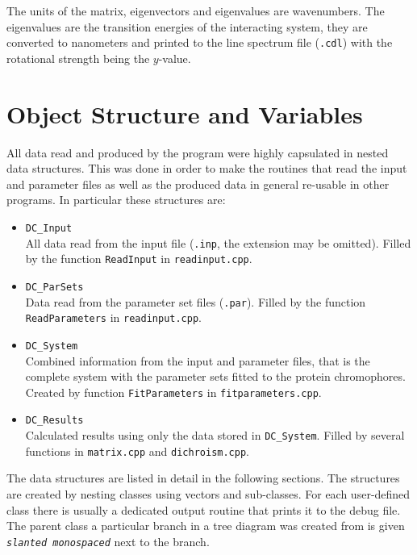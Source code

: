 \documentclass[11pt, letterpaper]{article}
\begin{document}
The units of the matrix, eigenvectors and eigenvalues are wavenumbers. The eigenvalues are the transition energies of the interacting system, they are converted to nanometers and printed to the line spectrum file (\verb'.cdl') with the rotational strength being the $y$-value.




\newpage

\section{Object Structure and Variables}

\label{Sec:ObjectStructure}

All data read and produced by the program were highly capsulated in nested data structures. This was done in order to make the routines that read the input and parameter files as well as the produced data in general re-usable in other programs. In particular these structures are:

\begin{itemize}
\item \verb'DC_Input' \\
All data read from the input file (\verb'.inp', the extension may be omitted). Filled by the function \texttt{ReadInput} in \verb'readinput.cpp'.

\item \verb'DC_ParSets' \\
Data read from the parameter set files (\verb'.par'). Filled by the function \texttt{ReadParameters} in \verb'readinput.cpp'.

\item \verb'DC_System' \\
Combined information from the input and parameter files, that is the complete system with the parameter sets fitted to the protein chromophores. Created by function \texttt{FitParameters} in \verb'fitparameters.cpp'.

\item \verb'DC_Results' \\
Calculated results using only the data stored in \verb'DC_System'. Filled by several functions in \verb'matrix.cpp' and \verb'dichroism.cpp'.
\end{itemize}

The data structures are listed in detail in the following sections. The structures are created by nesting classes using vectors and sub-classes. For each user-defined class there is usually a dedicated output routine that prints it to the debug file. The parent class a particular branch in a tree diagram was created from is given \texttt{\textit{slanted monospaced}} next to the branch.
\end{document}
